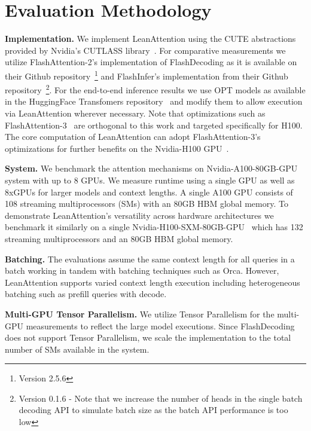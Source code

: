 \section{Evaluation Methodology}
\label{sec:evalmethod}

{\textbf{Implementation.} We implement LeanAttention using the CUTE abstractions~\cite{cutelayout, cutetensor, cutemma} provided by Nvidia's CUTLASS library~\cite{cutlassgithub}. For comparative measurements we utilize FlashAttention-2's implementation of FlashDecoding as it is available on their Github repository~\cite{githubGitHubDaoAILabflashattention}\footnote{Version 2.5.6} and FlashInfer's implementation from their Github repository~\cite{flashinfer}\footnote{Version 0.1.6 - Note that we increase the number of heads in the single batch decoding API to simulate batch size as the batch API performance is too low}. For the end-to-end inference results we use OPT models as available in the HuggingFace Transfomers repository~\cite{huggingface} and modify them to allow execution via LeanAttention wherever necessary. Note that optimizations such as FlashAttention-3~\cite{flashattention3} are orthogonal to this work and targeted specifically for H100. The core computation of LeanAttention can adopt FlashAttention-3's optimizations for further benefits on the Nvidia-H100 GPU~\cite{luo2024benchmarkingdissectingnvidiahopper}.

{\textbf{System.} We benchmark the attention mechanisms on Nvidia-A100-80GB-GPU~\cite{nvidiaA100} system with up to 8 GPUs. We measure runtime using a single GPU as well as 8xGPUs for larger models and context lengths. A single A100 GPU consists of 108 streaming multiprocessors (SMs) with an 80GB HBM global memory. To demonstrate LeanAttention's versatility across hardware architectures we benchmark it similarly on a single Nvidia-H100-SXM-80GB-GPU~\cite{luo2024benchmarkingdissectingnvidiahopper} which has 132 streaming multiprocessors and an 80GB HBM global memory.

{\textbf{Batching.}} The evaluations assume the same context length for all queries in a batch working in tandem with batching techniques such as Orca\cite{orca22}. However, LeanAttention supports varied context length execution including heterogeneous batching such as prefill queries with decode.

{\textbf{Multi-GPU Tensor Parallelism.}} We utilize Tensor Parallelism for the multi-GPU measurements to reflect the large model executions. Since FlashDecoding does not support Tensor Parallelism, we scale the implementation to the total number of SMs available in the system.

}}
